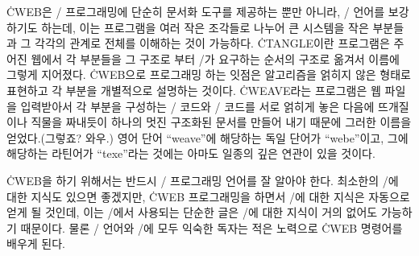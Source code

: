 \.{CWEB}은 \CEE/ 프로그래밍에 단순히 문서화 도구를 제공하는 뿐만 아니라, \CEE/ 언어를
보강하기도 하는데, 이는 프로그램을 여러 작은 조각들로 나누어 큰 시스템을 작은 부분들과 그
각각의 관계로 전체를 이해하는 것이 가능하다. \.{CTANGLE}이란 프로그램은 주어진 웹에서 각
부분들을 그 구조로 부터 \CEE/가 요구하는 순서의 구조로 옮겨서 이름에 그렇게 지어졌다.
\.{CWEB}으로 프로그래밍 하는 잇점은 알고리즘을 얽히지 않은 형태로 표현하고 각 부분을
개별적으로 설명하는 것이다. \.{CWEAVE}라는 프로그램은 웹 파일을 입력받아서 각 부분을
구성하는 \TEX/ 코드와 \CEE/ 코드를 서로 얽히게 놓은 다음에 뜨개질이나 직물을 짜내듯이
하나의 멋진 구조화된 문서를 만들어 내기 때문에 그러한 이름을 얻었다.(그렇죠? 와우.)
영어 단어 ``weave''에 해당하는 독일 단어가 ``webe''이고, 그에 해당하는 라틴어가
``texe''라는 것에는 아마도 일종의 깊은 연관이 있을 것이다. 

\.{CWEB}을 하기 위해서는 반드시 \CEE/ 프로그래밍 언어를 잘 알아야 한다. 최소한의 \TEX/에
대한 지식도 있으면 좋겠지만, \.{CWEB} 프로그래밍을 하면서 \TEX/에 대한 지식은 자동으로 얻게
될 것인데, 이는 \TEX/에서 사용되는 단순한 글은 \TEX/에 대한 지식이 거의 없어도 가능하기
때문이다. 물론 \CEE/ 언어와 \TEX/에 모두 익숙한 독자는 적은 노력으로 \.{CWEB} 명령어를
배우게 된다.

